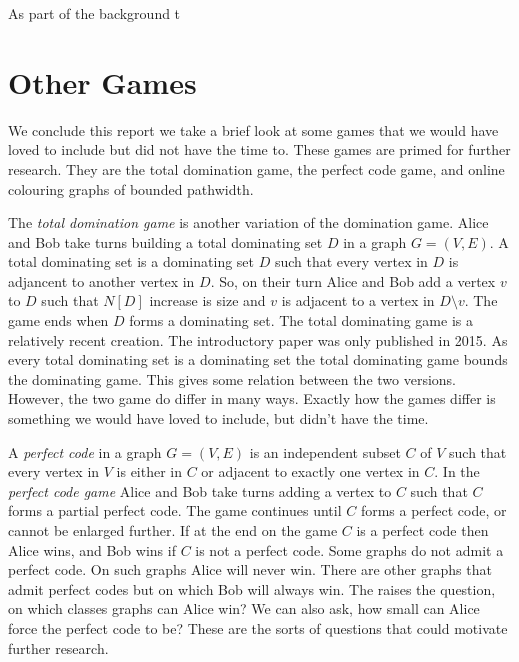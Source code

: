 As part of the background t

\section{Other Games}
We conclude this report we take a brief look at some games that we would have loved to include but did not have the time to. These games are primed for further research. They are the total domination game, the perfect code game, and online colouring graphs of bounded pathwidth.

The \textit{total domination game} is another variation of the domination game. Alice and Bob take turns building a total dominating set $D$ in a graph $G=(V,E)$. A total dominating set is a dominating set $D$ such that every vertex in $D$ is adjancent to another vertex in $D$. So, on their turn Alice and Bob add a vertex $v$ to $D$ such that $N[D]$ increase is size and $v$ is adjacent to a vertex in $D\setminus v$. The game ends when $D$ forms a dominating set. The total dominating game is a relatively recent creation. The introductory paper \cite{henning2015total} was only published in 2015. As every total dominating set is a dominating set the total dominating game bounds the dominating game. This gives some relation between the two versions. However, the two game do differ in many ways. Exactly how the games differ is something we would have loved to include, but didn't have the time.

A \textit{perfect code} in a graph $G=(V,E)$ is an independent subset $C$ of $V$ such that every vertex in $V$ is either in $C$ or adjacent to exactly one vertex in $C$. In the \textit{perfect code game} Alice and Bob take turns adding a vertex to $C$ such that $C$ forms a partial perfect code. The game continues until $C$ forms a perfect code, or cannot be enlarged further. If at the end on the game $C$ is a perfect code then Alice wins, and Bob wins if $C$ is not a perfect code. Some graphs do not admit a perfect code. On such graphs Alice will never win. There are other graphs that admit perfect codes but on which Bob will always win. The raises the question, on which classes graphs can Alice win? We can also ask, how small can Alice force the perfect code to be? These are the sorts of questions that could motivate further research. 

